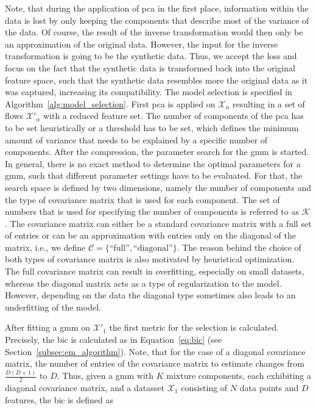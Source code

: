 \documentclass[../../main.tex]{subfiles}
\begin{document}
 Note, that during the application of \gls{pca} in the first place, information within the data is lost by only keeping the components that describe most of the variance of the data. Of course, the result of the inverse transformation would then only be an approximation of the original data. However, the input for the inverse transformation is going to be the synthetic data. Thus, we accept the loss and focus on the fact that the synthetic data is transformed back into the original feature space, such that the synthetic data resembles more the original data as it was captured, increasing its compatibility.
 \newpage
 The model selection is specified in Algorithm~\ref{alg:model_selection}. First \gls{pca} is applied on $\mathcal{X}_\alpha$ resulting in a set of flows $\mathcal{X}'_\alpha$ with a reduced feature set. The number of components of the \gls{pca} has to be set heuristically or a threshold has to be set, which defines the minimum amount of variance that needs to be explained by a specific number of components. After the compression, the parameter search for the \gls{gmm} is started. In general, there is no exact method to determine the optimal parameters for a \gls{gmm}, such that different parameter settings have to be evaluated. For that, the search space is defined by two dimensions, namely the number of components and the type of covariance matrix that is used for each component. The set of numbers that is used for specifying the number of components is referred to as $\mathcal{K}$. The covariance matrix can either be a standard covariance matrix with a full set of entries or can be an approximation with entries only on the diagonal of the matrix, i.e., we define $\mathcal{C} = \{\text{``full''}, \text{``diagonal''}\}$. The reason behind the choice of both types of covariance matrix is also motivated by heuristical optimization. The full covariance matrix can result in overfitting, especially on small datasets, whereas the diagonal matrix acts as a type of regularization to the model. However, depending on the data the diagonal type sometimes also leads to an underfitting of the model.

 After fitting a \gls{gmm} on $\mathcal{X}'_1$ the first metric for the selection is calculated. Precisely, the \gls{bic} is calculated as in Equation~\ref{eq:bic} (see Section~\ref{subsec:em_algorithm}). Note, that for the case of a diagonal covariance matrix, the number of entries of the covariance matrix to estimate changes from $\frac{D(D+1)}{2}$ to $D$. Thus, given a \gls{gmm} with $K$ mixture components, each exhibiting a diagonal covariance matrix, and a datasset $\mathcal{X}_1$ consisting of $N$ data points and $D$ features, the \gls{bic} is defined as
\end{document}

